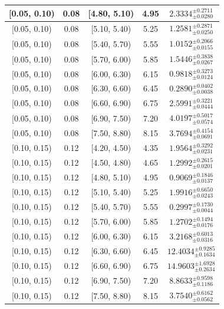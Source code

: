 \begin{longtable}{|c|c|c|c|c|}
\hline
[0.05, 0.10) & 0.08 & [4.80, 5.10) & 4.95 & $2.3334^{ \pm 0.2711 }_{ \pm 0.0280 }$ \\ 
\hline
[0.05, 0.10) & 0.08 & [5.10, 5.40) & 5.25 & $1.2581^{ \pm 0.2871 }_{ \pm 0.0250 }$ \\ 
\hline
[0.05, 0.10) & 0.08 & [5.40, 5.70) & 5.55 & $1.0152^{ \pm 0.2066 }_{ \pm 0.0155 }$ \\ 
\hline
[0.05, 0.10) & 0.08 & [5.70, 6.00) & 5.85 & $1.5446^{ \pm 0.3838 }_{ \pm 0.0267 }$ \\ 
\hline
[0.05, 0.10) & 0.08 & [6.00, 6.30) & 6.15 & $0.9818^{ \pm 0.3273 }_{ \pm 0.0124 }$ \\ 
\hline
[0.05, 0.10) & 0.08 & [6.30, 6.60) & 6.45 & $0.2890^{ \pm 0.0402 }_{ \pm 0.0038 }$ \\ 
\hline
[0.05, 0.10) & 0.08 & [6.60, 6.90) & 6.75 & $2.5991^{ \pm 0.3221 }_{ \pm 0.0444 }$ \\ 
\hline
[0.05, 0.10) & 0.08 & [6.90, 7.50) & 7.20 & $4.0197^{ \pm 0.5017 }_{ \pm 0.0574 }$ \\ 
\hline
[0.05, 0.10) & 0.08 & [7.50, 8.80) & 8.15 & $3.7694^{ \pm 0.4154 }_{ \pm 0.0691 }$ \\ 
\hline
[0.10, 0.15) & 0.12 & [4.20, 4.50) & 4.35 & $1.9564^{ \pm 0.3292 }_{ \pm 0.0231 }$ \\ 
\hline
[0.10, 0.15) & 0.12 & [4.50, 4.80) & 4.65 & $1.2992^{ \pm 0.2615 }_{ \pm 0.0201 }$ \\ 
\hline
[0.10, 0.15) & 0.12 & [4.80, 5.10) & 4.95 & $0.9069^{ \pm 0.1846 }_{ \pm 0.0137 }$ \\ 
\hline
[0.10, 0.15) & 0.12 & [5.10, 5.40) & 5.25 & $1.9916^{ \pm 0.6650 }_{ \pm 0.0243 }$ \\ 
\hline
[0.10, 0.15) & 0.12 & [5.40, 5.70) & 5.55 & $0.2997^{ \pm 0.1730 }_{ \pm 0.0044 }$ \\ 
\hline
[0.10, 0.15) & 0.12 & [5.70, 6.00) & 5.85 & $1.2702^{ \pm 0.1494 }_{ \pm 0.0176 }$ \\ 
\hline
[0.10, 0.15) & 0.12 & [6.00, 6.30) & 6.15 & $3.2168^{ \pm 0.6013 }_{ \pm 0.0316 }$ \\ 
\hline
[0.10, 0.15) & 0.12 & [6.30, 6.60) & 6.45 & $12.4034^{ \pm 0.9285 }_{ \pm 0.1634 }$ \\ 
\hline
[0.10, 0.15) & 0.12 & [6.60, 6.90) & 6.75 & $14.9603^{ \pm 1.6928 }_{ \pm 0.2634 }$ \\ 
\hline
[0.10, 0.15) & 0.12 & [6.90, 7.50) & 7.20 & $8.8633^{ \pm 0.9598 }_{ \pm 0.1186 }$ \\ 
\hline
[0.10, 0.15) & 0.12 & [7.50, 8.80) & 8.15 & $3.7540^{ \pm 0.6162 }_{ \pm 0.0562 }$ \\ 

\end{longtable}
